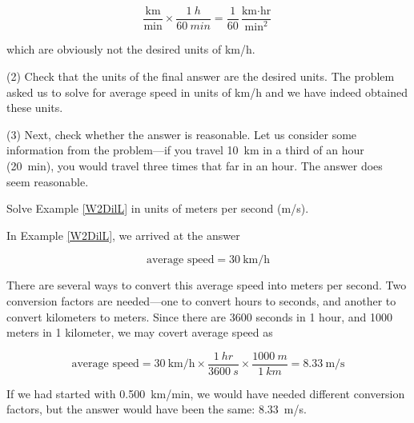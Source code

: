 \documentclass[main-ap-physics.tex]{subfiles}
\begin{document}
\begin{equation*}
    \frac{\text{km}}{\text{min}} \times \frac{\SI{1}{h}}{\SI{60}{min}} = \frac{1}{60} \frac{\text{km} \cdot \text{hr}}{\text{min}^2}
\end{equation*}

which are obviously not the desired units of km/h.

\vspace{1em}

(2) Check that the units of the final answer are the desired units. The problem asked us to solve for average speed in units of km/h and we have indeed obtained these units.

\vspace{1em}

(3) Next, check whether the answer is reasonable. Let us consider some information from the problem---if you travel \SI{10}{km} in a third of an hour (\SI{20}{min}), you would travel three times that far in an hour. The answer does seem reasonable.

\endsolution

\begin{example}
    Solve Example \ref{W2DilL} in units of meters per second (m/s).
\end{example}

\Solution In Example \ref{W2DilL}, we arrived at the answer

\begin{equation*}
    \text{average speed} = \SI[per-mode=fraction]{30}{\kilo\meter\per\hour}
\end{equation*}

There are several ways to convert this average speed into meters per second. Two conversion factors are needed---one to convert hours to seconds, and another to convert kilometers to meters. Since there are 3600 seconds in 1 hour, and 1000 meters in 1 kilometer, we may covert average speed as

\begin{equation*}
    \text{average speed} = \SI[per-mode=fraction]{30}{\kilo\meter\per\hour} \times \frac{\SI{1}{hr}}{\SI{3600}{s}} \times \frac{\SI{1000}{m}}{\SI{1}{km}} = \SI[per-mode=fraction]{8.33}{\meter\per\second}
\end{equation*}

If we had started with \SI{0.500}{km/min}, we would have needed different conversion factors, but the answer would have been the same: \SI{8.33}{m/s}.

\endsolution
\end{document}
